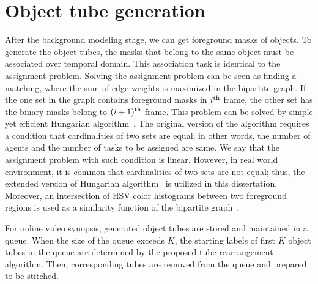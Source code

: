 \documentclass[11pt]{hyu_thesis}
\begin{document}
\section{Object tube generation}
\label{sec:framework:tube_gen}
After the background modeling stage, we can get foreground masks of objects. To generate the object tubes, the masks that belong to the same object must be associated over temporal domain. This association task is identical to the assignment problem. Solving the assignment problem can be seen as finding a matching, where the sum of edge weights is maximized in the bipartite graph. If the one set in the graph contains foreground masks in $i^{\rm{th}}$ frame, the other set has the binary masks belong to $(i+1)^{\rm{th}}$ frame. This problem can be solved by simple yet efficient Hungarian algorithm~\cite{Kuhn1955,kuhn1956variants,munkres1957algorithms}. The original version of the algorithm requires a condition that cardinalities of two sets are equal; in other words, the number of agents and the number of tasks to be assigned are same. We say that the assignment problem with such condition is linear. However, in real world environment, it is common that cardinalities of two sets are not equal; thus, the extended version of Hungarian algorithm~\cite{bourgeois1971extension} is utilized in this dissertation. Moreover, an intersection of HSV color histograms between two foreground regions is used as a similarity function of the bipartite graph~\cite{perez2002color}.

For online video synopsis, generated object tubes are stored and maintained in a queue. When the size of the queue exceeds $K$, the starting labels of first $K$ object tubes in the queue are determined by the proposed tube rearrangement algorithm. Then, corresponding tubes are removed from the queue and prepared to be stitched.
\end{document}
